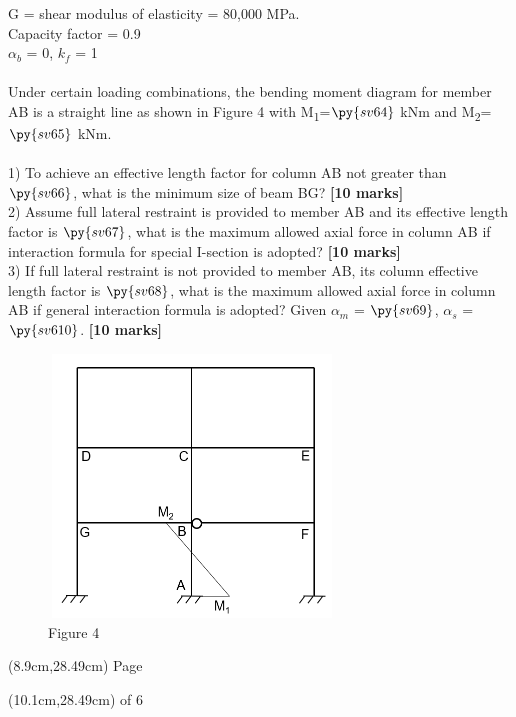 \documentclass[a4paper,11pt]{article}
\begin{document}
G = shear modulus of elasticity = 80,000 MPa.\\
Capacity factor \phi = 0.9\\
$\alpha_b$ = 0, $k_f$ = 1\\
\\
Under certain loading combinations, the bending moment diagram for member AB is a straight line as shown in Figure 4 with M\textsubscript{1}=$\py{sv64}$ kNm and M\textsubscript{2}=$\py{sv65}$ kNm.\\
\\
1) To achieve an effective length factor for column AB not greater than $\py{sv66}$, what is the minimum size of beam BG? \textbf{[10 marks]}\\
2) Assume full lateral restraint is provided to member AB and its effective length factor is $\py{sv67}$, what is the maximum allowed axial force in column AB if interaction formula for special I-section is adopted? \textbf{[10 marks]}\\
3) If full lateral restraint is not provided to member AB, its column effective length factor is $\py{sv68}$, what is the maximum allowed axial force in column AB if general interaction formula is adopted? Given $\alpha_m$ = $\py{sv69}$, $\alpha_s$ = $\py{sv610}$. \textbf{[10 marks]}\\
\begin{figure}[ht]
\includegraphics[width=7.604cm, height=7cm]{Figure4.png}\\
\centering
Figure 4\\
\centering
\end{figure}
\begin{textblock*}{5cm}(8.9cm,28.49cm)
Page
\end{textblock*}
\begin{textblock*}{5cm}(10.1cm,28.49cm)
of 6
\end{textblock*}
\newpage
\noindent
\end{document}
